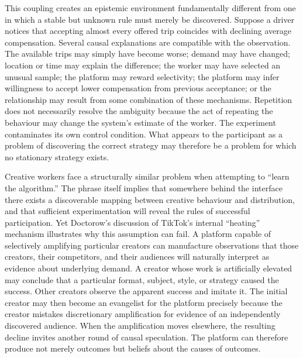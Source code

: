 \documentclass[11pt]{article}
\begin{document}
This coupling creates an epistemic environment fundamentally different from one in which a stable but unknown rule must merely be discovered. Suppose a driver notices that accepting almost every offered trip coincides with declining average compensation. Several causal explanations are compatible with the observation. The available trips may simply have become worse; demand may have changed; location or time may explain the difference; the worker may have selected an unusual sample; the platform may reward selectivity; the platform may infer willingness to accept lower compensation from previous acceptance; or the relationship may result from some combination of these mechanisms. Repetition does not necessarily resolve the ambiguity because the act of repeating the behaviour may change the system's estimate of the worker. The experiment contaminates its own control condition. What appears to the participant as a problem of discovering the correct strategy may therefore be a problem for which no stationary strategy exists.

Creative workers face a structurally similar problem when attempting to ``learn the algorithm.'' The phrase itself implies that somewhere behind the interface there exists a discoverable mapping between creative behaviour and distribution, and that sufficient experimentation will reveal the rules of successful participation. Yet Doctorow's discussion of TikTok's internal ``heating'' mechanism illustrates why this assumption can fail. A platform capable of selectively amplifying particular creators can manufacture observations that those creators, their competitors, and their audiences will naturally interpret as evidence about underlying demand. A creator whose work is artificially elevated may conclude that a particular format, subject, style, or strategy caused the success. Other creators observe the apparent success and imitate it. The initial creator may then become an evangelist for the platform precisely because the creator mistakes discretionary amplification for evidence of an independently discovered audience. When the amplification moves elsewhere, the resulting decline invites another round of causal speculation. The platform can therefore produce not merely outcomes but beliefs about the causes of outcomes.
\end{document}
